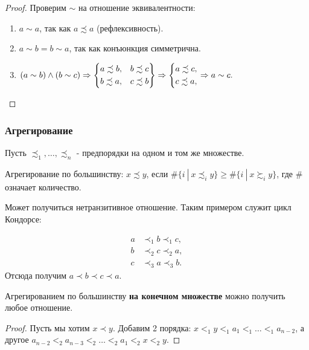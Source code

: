 \begin{proof}
	Проверим $\sim$ на отношение эквивалентности:
	\begin{enumerate}
		\item $a \sim a$, так как $a \precsim a$ (рефлексивность).
		\item $a \sim b = b \sim a$, так как конъюнкция симметрична.
		\item $(a \sim b) \wedge (b \sim c) \Rightarrow \left\{\begin{aligned}
			a \precsim b, & &b \precsim c \\ b \precsim a, & &c \precsim b
		\end{aligned}\right\} \Rightarrow \left\{\begin{aligned}a \precsim c, \\ c \precsim a,\end{aligned}\right. \Rightarrow a \sim c.$
	\end{enumerate}
\end{proof}

\subsubsection*{Агрегирование}

\begin{definition}
	Пусть $\precsim_1, \dots, \precsim_n$ - предпорядки на одном и том же множестве.
	
	Агрегирование по большинству: $x \precsim y$, если $\#\{i\ |\ x \precsim_i y\} \ge \#\{i\ |\ x \succsim_i y\}$, где $\#$ означает количество.
\end{definition}

\begin{note}
	Может получиться нетранзитивное отношение. Таким примером служит цикл Кондорсе:
	
	\begin{align*}
	a &\prec_1 b \prec_1 c,
	\\
	b &\prec_2 c \prec_2 a,
	\\
	c &\prec_3 a \prec_3 b.
	\end{align*}
	Отсюда получим $a \prec b \prec c \prec a$.
\end{note}

\begin{theorem}
	Агрегированием по большинству \textbf{на конечном множестве} можно получить любое отношение.
\end{theorem}

\begin{proof}
	Пусть мы хотим $x \prec y$. Добавим 2 порядка: $x <_1 y <_1 a_1 <_1 \dots <_1 a_{n - 2}$, а другое $a_{n - 2} <_2 a_{n - 3} <_2 \dots <_2 a_1 <_2 x <_2 y$.
\end{proof}

